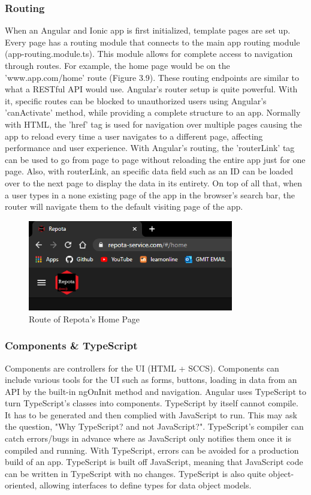 \subsubsection{Routing}
When an Angular and Ionic app is first initialized, template pages are set up. Every page has a routing module that connects to the main app routing module (app-routing.module.ts). This module allows for complete access to navigation through routes. For example, the home page would be on the 'www.app.com/home' route (Figure 3.9). These routing endpoints are similar to what a RESTful API would use. Angular's router setup is quite powerful. With it, specific routes can be blocked to unauthorized users using Angular's 'canActivate' method, while providing a complete structure to an app. Normally with HTML, the 'href' tag is used for navigation over multiple pages causing the app to reload every time a user navigates to a different page, affecting performance and user experience. With Angular's routing, the 'routerLink' tag can be used to go from page to page without reloading the entire app just for one page. Also, with routerLink, an specific data field such as an ID can be loaded over to the next page to display the data in its entirety. On top of all that, when a user types in a none existing page of the app in the browser's search bar, the router will navigate them to the default visiting page of the app. \cite{ref15}

\begin{figure}[H]
    \caption{Route of Repota's Home Page}
    \label{image:homeRoute}
    \centering
    \includegraphics[width=0.8\textwidth]{images/misc/home-route.png}
\end{figure}

\subsubsection{Components \& TypeScript}
Components are controllers for the UI (HTML + SCCS). Components can include various tools for the UI such as forms, buttons, loading in data from an API by the built-in ngOnInit method and navigation. Angular uses TypeScript to turn TypeScript's classes into components. TypeScript by itself cannot compile. It has to be generated and then complied with JavaScript to run. This may ask the question, "Why TypeScript? and not JavaScript?". TypeScript's compiler can catch errors/bugs in advance where as JavaScript only notifies them once it is compiled and running. With TypeScript, errors can be avoided for a production build of an app. TypeScript is built off JavaScript, meaning that JavaScript code can be written in TypeScript with no changes. TypeScript is also quite object-oriented, allowing interfaces to define types for data object models. \cite{ref16}

